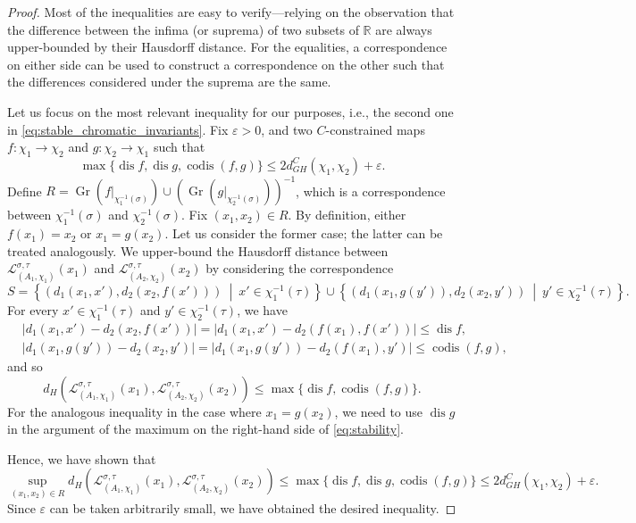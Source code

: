 \documentclass[8pt,a4paper,oneside,english,english]{article}
\theoremstyle{plain}
\theoremstyle
{plain}
\theoremstyle{definition}
\newcommand{\R}{\mathbb{R}}
\newcommand{\setdef}[2]{\left\{{#1} \ \middle|\ {#2}\right\}}
\newcommand{\GH}{d_{GH}}
\newcommand{\MP}[1]{(A_{#1},\chi_{#1})}
\DeclareMathOperator{\dis}{dis}
\DeclareMathOperator{\codis}{codis}
\DeclareMathOperator{\gr}{Gr}
\begin{document}
\begin{proof}
Most of the inequalities are easy to verify---relying on the observation that the difference between the infima (or suprema) of two subsets of $\R$ are always upper-bounded by their Hausdorff distance. For the equalities, a correspondence on either side can be used to construct a correspondence on the other such that the differences considered under the suprema are the same.

Let us focus on the most relevant inequality for our purposes, i.e., the second one in \eqref{eq:stable_chromatic_invariants}. Fix $\varepsilon>0$, and two $C$-constrained maps $f\colon\chi_1\to\chi_2$ and $g\colon\chi_2\to\chi_1$ 
such that
\[
    \max\{\dis f,\dis g,\codis(f,g)\}\leq 2\GH^C(\chi_1,\chi_2)+\varepsilon.
\]
Define $R=\gr(f|_{\chi_1^{-1}(\sigma)})\cup(\gr(g|_{\chi_2^{-1}(\sigma)}))^{-1}$, which is a correspondence between $\chi_1^{-1}(\sigma)$ and $\chi_2^{-1}(\sigma)$.
Fix $(x_1,x_2)\in R$. By definition, either $f(x_1)=x_2$ or $x_1=g(x_2)$. Let us consider the former case; the latter can be treated analogously. We upper-bound the Hausdorff distance between $\mathcal L_{\MP{1}}^{\sigma,\tau}(x_1)$ and $\mathcal L_{\MP{2}}^{\sigma,\tau}(x_2)$ by considering the correspondence \[
    S = \setdef{(d_1(x_1, x'), d_2(x_2, f(x')))}{x'\in\chi_1^{-1}(\tau)} \cup \setdef{(d_1(x_1, g(y')), d_2(x_2, y'))}{y'\in\chi_2^{-1}(\tau)}.
\] 
For every $x'\in\chi_1^{-1}(\tau)$ and $y'\in\chi_2^{-1}(\tau)$, we have
\begin{align*}
&\lvert d_1(x_1,x')-d_2(x_2,f(x'))\rvert = \lvert d_1(x_1,x')-d_2(f(x_1),f(x'))\rvert \leq \dis f,
\\
&\lvert d_1(x_1,g(y'))-d_2(x_2,y')\rvert = \lvert d_1(x_1,g(y'))-d_2(f(x_1),y')\rvert \leq \codis(f,g),
\end{align*}
and so 
\begin{equation}\label{eq:stability}
    d_H(\mathcal L_{\MP{1}}^{\sigma,\tau}(x_1),\mathcal L_{\MP{2}}^{\sigma,\tau}(x_2))\leq\max\{\dis f,\codis(f,g)\}.
\end{equation}
For the analogous inequality in the case where $x_1=g(x_2)$, we need to use $\dis g$ in the argument of the maximum on the right-hand side of \eqref{eq:stability}.

Hence, we have shown that
\[
    \sup_{(x_1,x_2)\in R}d_H(\mathcal L_{\MP{1}}^{\sigma,\tau}(x_1),\mathcal L_{\MP{2}}^{\sigma,\tau}(x_2))\leq\max\{\dis f,\dis g,\codis(f,g)\}\leq 2\GH^C(\chi_1,\chi_2)+\varepsilon.
\]
Since $\varepsilon$ can be taken arbitrarily small, we have obtained the desired inequality.
\end{proof}
\end{document}

